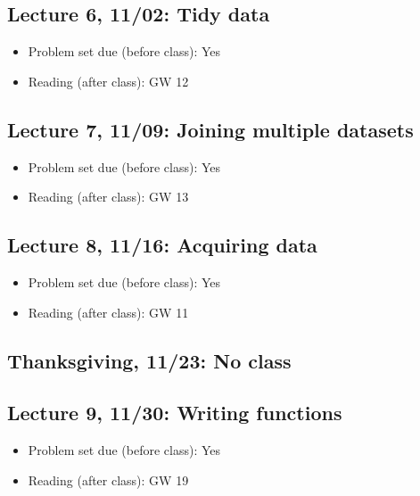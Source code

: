 \documentclass[11pt,]{article}
\providecommand{\tightlist}{%
  \setlength{\itemsep}{0pt}\setlength{\parskip}{0pt}}
\begin{document}
\subsection{Lecture 6, 11/02: Tidy data}\label{lecture-6-1102-tidy-data}

\begin{itemize}
\tightlist
\item
  Problem set due (before class): Yes
\item
  Reading (after class): GW 12
\end{itemize}

\subsection{Lecture 7, 11/09: Joining multiple
datasets}\label{lecture-7-1109-joining-multiple-datasets}

\begin{itemize}
\tightlist
\item
  Problem set due (before class): Yes
\item
  Reading (after class): GW 13
\end{itemize}

\subsection{Lecture 8, 11/16: Acquiring
data}\label{lecture-8-1116-acquiring-data}

\begin{itemize}
\tightlist
\item
  Problem set due (before class): Yes
\item
  Reading (after class): GW 11
\end{itemize}

\subsection{Thanksgiving, 11/23: No
class}\label{thanksgiving-1123-no-class}

\subsection{Lecture 9, 11/30: Writing
functions}\label{lecture-9-1130-writing-functions}

\begin{itemize}
\tightlist
\item
  Problem set due (before class): Yes
\item
  Reading (after class): GW 19
\end{itemize}
\end{document}
